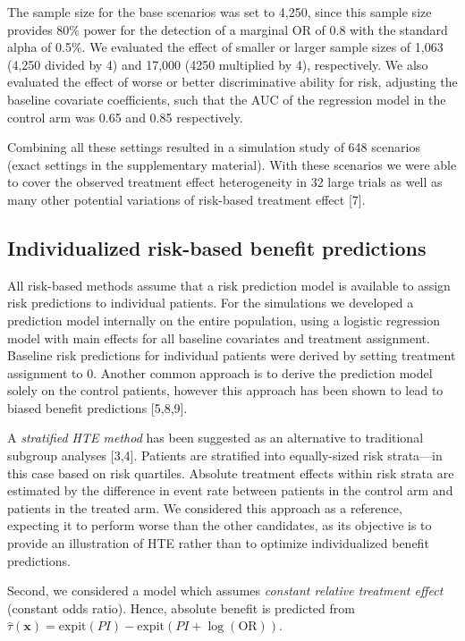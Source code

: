 \documentclass[]{elsarticle} %
\begin{document}
The sample size for the base scenarios was set to 4,250, since this
sample size provides \(80\%\) power for the detection of a marginal OR
of 0.8 with the standard alpha of 0.5\%. We evaluated the effect of
smaller or larger sample sizes of 1,063 (4,250 divided by 4) and 17,000
(4250 multiplied by 4), respectively. We also evaluated the effect of
worse or better discriminative ability for risk, adjusting the baseline
covariate coefficients, such that the AUC of the regression model in the
control arm was 0.65 and 0.85 respectively.

Combining all these settings resulted in a simulation study of 648
scenarios (exact settings in the supplementary material). With these
scenarios we were able to cover the observed treatment effect
heterogeneity in 32 large trials as well as many other potential
variations of risk-based treatment effect {[}7{]}.

\hypertarget{individualized-risk-based-benefit-predictions}{%
\subsection{Individualized risk-based benefit
predictions}\label{individualized-risk-based-benefit-predictions}}

All risk-based methods assume that a risk prediction model is available
to assign risk predictions to individual patients. For the simulations
we developed a prediction model internally on the entire population,
using a logistic regression model with main effects for all baseline
covariates and treatment assignment. Baseline risk predictions for
individual patients were derived by setting treatment assignment to 0.
Another common approach is to derive the prediction model solely on the
control patients, however this approach has been shown to lead to biased
benefit predictions {[}5,8,9{]}.

A \emph{stratified HTE method} has been suggested as an alternative to
traditional subgroup analyses {[}3,4{]}. Patients are stratified into
equally-sized risk strata---in this case based on risk quartiles.
Absolute treatment effects within risk strata are estimated by the
difference in event rate between patients in the control arm and
patients in the treated arm. We considered this approach as a reference,
expecting it to perform worse than the other candidates, as its
objective is to provide an illustration of HTE rather than to optimize
individualized benefit predictions.

Second, we considered a model which assumes \emph{constant relative
treatment effect} (constant odds ratio). Hence, absolute benefit is
predicted from
\(\hat{\tau}(\bm{x}) = \text{expit}(PI) - \text{expit}(PI +\log(\text{OR}))\).
\end{document}
